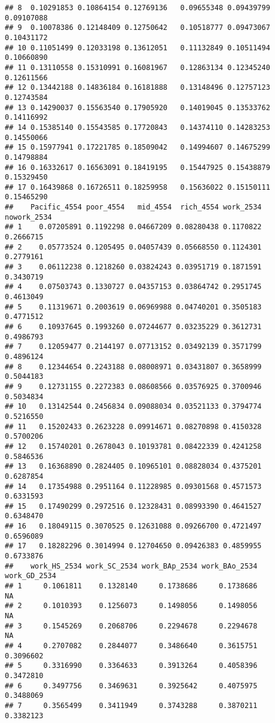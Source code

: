 \documentclass[
]{article}
\begin{document}
\begin{verbatim}
## 8  0.10291853 0.10864154 0.12769136   0.09655348 0.09439799    0.09107088
## 9  0.10078386 0.12148409 0.12750642   0.10518777 0.09473067    0.10431172
## 10 0.11051499 0.12033198 0.13612051   0.11132849 0.10511494    0.10660890
## 11 0.13110558 0.15310991 0.16081967   0.12863134 0.12345240    0.12611566
## 12 0.13442188 0.14836184 0.16181888   0.13148496 0.12757123    0.12743584
## 13 0.14290037 0.15563540 0.17905920   0.14019045 0.13533762    0.14116992
## 14 0.15385140 0.15543585 0.17720843   0.14374110 0.14283253    0.14550066
## 15 0.15977941 0.17221785 0.18509042   0.14994607 0.14675299    0.14798884
## 16 0.16332617 0.16563091 0.18419195   0.15447925 0.15438879    0.15329450
## 17 0.16439868 0.16726511 0.18259958   0.15636022 0.15150111    0.15465290
##    Pacific_4554 poor_4554   mid_4554  rich_4554 work_2534 nowork_2534
## 1    0.07205891 0.1192298 0.04667209 0.08280438 0.1170822   0.2666715
## 2    0.05773524 0.1205495 0.04057439 0.05668550 0.1124301   0.2779161
## 3    0.06112238 0.1218260 0.03824243 0.03951719 0.1871591   0.3430719
## 4    0.07503743 0.1330727 0.04357153 0.03864742 0.2951745   0.4613049
## 5    0.11319671 0.2003619 0.06969988 0.04740201 0.3505183   0.4771512
## 6    0.10937645 0.1993260 0.07244677 0.03235229 0.3612731   0.4986793
## 7    0.12059477 0.2144197 0.07713152 0.03492139 0.3571799   0.4896124
## 8    0.12344654 0.2243188 0.08008971 0.03431807 0.3658999   0.5044183
## 9    0.12731155 0.2272383 0.08608566 0.03576925 0.3700946   0.5034834
## 10   0.13142544 0.2456834 0.09088034 0.03521133 0.3794774   0.5216550
## 11   0.15202433 0.2623228 0.09914671 0.08270898 0.4150328   0.5700206
## 12   0.15740201 0.2678043 0.10193781 0.08422339 0.4241258   0.5846536
## 13   0.16368890 0.2824405 0.10965101 0.08828034 0.4375201   0.6287854
## 14   0.17354988 0.2951164 0.11228985 0.09301568 0.4571573   0.6331593
## 15   0.17490299 0.2972516 0.12328431 0.08993390 0.4641527   0.6348470
## 16   0.18049115 0.3070525 0.12631088 0.09266700 0.4721497   0.6596089
## 17   0.18282296 0.3014994 0.12704650 0.09426383 0.4859955   0.6733876
##    work_HS_2534 work_SC_2534 work_BAp_2534 work_BAo_2534 work_GD_2534
## 1     0.1061811    0.1328140     0.1738686     0.1738686           NA
## 2     0.1010393    0.1256073     0.1498056     0.1498056           NA
## 3     0.1545269    0.2068706     0.2294678     0.2294678           NA
## 4     0.2707082    0.2844077     0.3486640     0.3615751    0.3096602
## 5     0.3316990    0.3364633     0.3913264     0.4058396    0.3472810
## 6     0.3497756    0.3469631     0.3925642     0.4075975    0.3488069
## 7     0.3565499    0.3411949     0.3743288     0.3870211    0.3382123

\end{verbatim}
\end{document}
